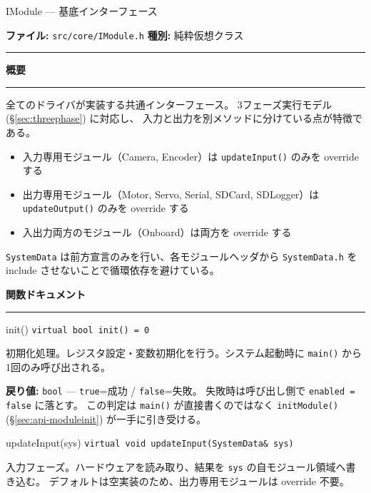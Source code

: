 \documentclass[a4paper,11pt,dvipdfmx]{jsarticle}
\makeatletter
\newcommand{\apisection}[1]{%
  \par\addvspace{4mm}%
  {\normalsize\bfseries\color{headerblue} #1}%
  \par\vspace{-1mm}%
  {\color{accentblue!40}\rule{\linewidth}{0.5pt}}%
  \par\nobreak\vspace{2mm}%
  \@afterheading
}
\makeatother
\begin{document}
\begin{apibox}{IModule --- 基底インターフェース}

\textbf{ファイル:} \texttt{src/core/IModule.h} \hfill
\textbf{種別:} 純粋仮想クラス

\vspace{2mm}\hrule\vspace{2mm}

\apisection{概要}

全てのドライバが実装する共通インターフェース。
3フェーズ実行モデル (\hyperref[sec:threephase]{§\ref*{sec:threephase}}) に対応し、
入力と出力を別メソッドに分けている点が特徴である。

\begin{itemize}[nosep]
  \item 入力専用モジュール（Camera, Encoder）は \texttt{updateInput()} のみを override する
  \item 出力専用モジュール（Motor, Servo, Serial, SDCard, SDLogger）は \texttt{updateOutput()} のみを override する
  \item 入出力両方のモジュール（Onboard）は両方を override する
\end{itemize}

\texttt{SystemData} は前方宣言のみを行い、各モジュールヘッダから
\texttt{SystemData.h} を include させないことで循環依存を避けている。

\apisection{関数ドキュメント}

\begin{funcblock}{init()}
\texttt{virtual bool init() = 0}

\vspace{1.5mm}
初期化処理。レジスタ設定・変数初期化を行う。システム起動時に \texttt{main()} から1回のみ呼び出される。

\vspace{1.5mm}
\textbf{戻り値:} \texttt{bool} --- \texttt{true}=成功 / \texttt{false}=失敗。
失敗時は呼び出し側で \texttt{enabled = false} に落とす。
この判定は \texttt{main()} が直接書くのではなく
\texttt{initModule()} (\hyperref[sec:api-moduleinit]{§\ref*{sec:api-moduleinit}})
が一手に引き受ける。
\end{funcblock}

\begin{funcblock}{updateInput(sys)}
\texttt{virtual void updateInput(SystemData\& sys)}

\vspace{1.5mm}
入力フェーズ。ハードウェアを読み取り、結果を \texttt{sys} の自モジュール領域へ書き込む。
デフォルトは空実装のため、出力専用モジュールは override 不要。
\end{funcblock}


\end{apibox}
\end{document}
